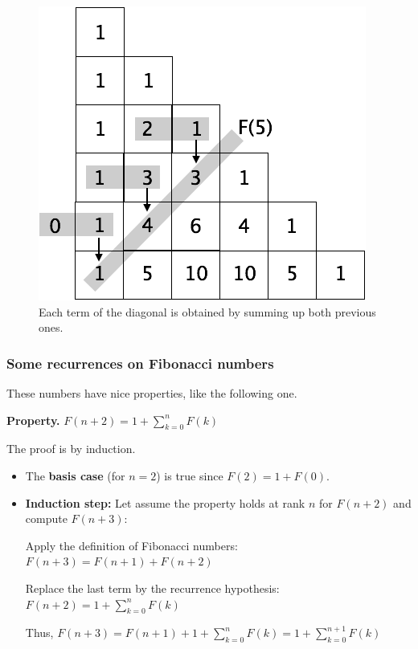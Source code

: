 \begin{figure}[h]
\begin{center}
        \includegraphics[scale=0.4]{FiguresMaths//FiboPascal2}
        \caption{Each term of the diagonal is obtained by summing up both previous ones.}
        \label{fig:FiboPascalExplanation}
\end{center}
\end{figure}


\subsubsection{Some recurrences on Fibonacci numbers}

These numbers have nice properties, like the following one. 

\noindent \textbf{Property.} 
\label{prop:FiboSum}
$F(n+2) =1+ \sum_{k=0}^{n} F(k) $
\bigskip

\noindent The proof is by induction.

\begin{itemize}
\item
The \textbf{basis case} (for $n=2$) is true since $F(2) = 1+F(0)$.

\item
\textbf{Induction step:} Let assume the property holds at rank $n$ for $F(n+2)$ and compute $F(n+3)$:

Apply the definition of Fibonacci numbers: $F(n+3) = F(n+1)+F(n+2)$ 

Replace the last term by the recurrence hypothesis: $F(n+2) = 1+\sum_{k=0}^{n} F(k)$

Thus, $F(n+3) = F(n+1) + 1+ \sum_{k=0}^{n} F(k)  = 1+\sum_{k=0}^{n+1} F(k)$
\end{itemize}

